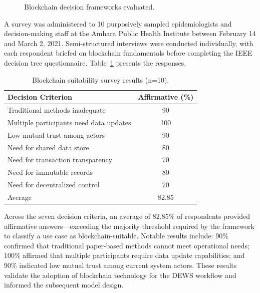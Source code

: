 \documentclass[AMA,LATO1COL]{WileyNJD-v2}
\begin{document}
\begin{figure}[!ht]
\centering
{}
\caption{Blockchain decision frameworks evaluated.}\label{fig:frameworks}
\end{figure}

A survey was administered to 10 purposively sampled epidemiologists and decision-making staff at the Amhara Public Health Institute between February 14 and March 2, 2021. Semi-structured interviews were conducted individually, with each respondent briefed on blockchain fundamentals before completing the IEEE decision tree questionnaire. Table~\ref{tab:survey} presents the responses.

\begin{table}[!ht]
\caption{Blockchain suitability survey results (n=10).}\label{tab:survey}
\begin{tabular*}{\columnwidth}{@{\extracolsep\fill}lc@{}}
\toprule
Decision Criterion & Affirmative (\%) \\
\midrule
Traditional methods inadequate & 90 \\
Multiple participants need data updates & 100 \\
Low mutual trust among actors & 90 \\
Need for shared data store & 80 \\
Need for transaction transparency & 70 \\
Need for immutable records & 80 \\
Need for decentralized control & 70 \\
\midrule
Average & 82.85 \\
\bottomrule
\end{tabular*}
\end{table}

Across the seven decision criteria, an average of 82.85\% of respondents provided affirmative answers---exceeding the majority threshold required by the framework to classify a use case as blockchain-suitable. Notable results include: 90\% confirmed that traditional paper-based methods cannot meet operational needs; 100\% affirmed that multiple participants require data update capabilities; and 90\% indicated low mutual trust among current system actors. These results validate the adoption of blockchain technology for the DEWS workflow and informed the subsequent model design.
\end{document}
